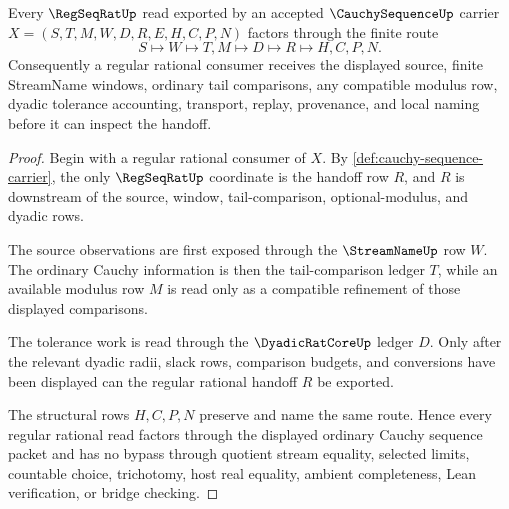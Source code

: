 \begin{theorem}
\label{thm:cauchy-sequence-regseqrat-handoff}
Every $\RegSeqRatUp$ read exported by an accepted $\CauchySequenceUp$ carrier $X=(S,T,M,W,D,R,E,H,C,P,N)$ factors through the finite route
$$
S \longmapsto W \longmapsto T,M \longmapsto D \longmapsto R \longmapsto H,C,P,N .
$$
Consequently a regular rational consumer receives the displayed source, finite StreamName windows, ordinary tail comparisons, any compatible modulus row, dyadic tolerance accounting, transport, replay, provenance, and local naming before it can inspect the handoff.
\end{theorem}
\begin{proof}
Begin with a regular rational consumer of $X$. By \autoref{def:cauchy-sequence-carrier}, the only $\RegSeqRatUp$ coordinate is the handoff row $R$, and $R$ is downstream of the source, window, tail-comparison, optional-modulus, and dyadic rows.

The source observations are first exposed through the $\StreamNameUp$ row $W$. The ordinary Cauchy information is then the tail-comparison ledger $T$, while an available modulus row $M$ is read only as a compatible refinement of those displayed comparisons.

The tolerance work is read through the $\DyadicRatCoreUp$ ledger $D$. Only after the relevant dyadic radii, slack rows, comparison budgets, and conversions have been displayed can the regular rational handoff $R$ be exported.

The structural rows $H,C,P,N$ preserve and name the same route. Hence every regular rational read factors through the displayed ordinary Cauchy sequence packet and has no bypass through quotient stream equality, selected limits, countable choice, trichotomy, host real equality, ambient completeness, Lean verification, or bridge checking.
\end{proof}

